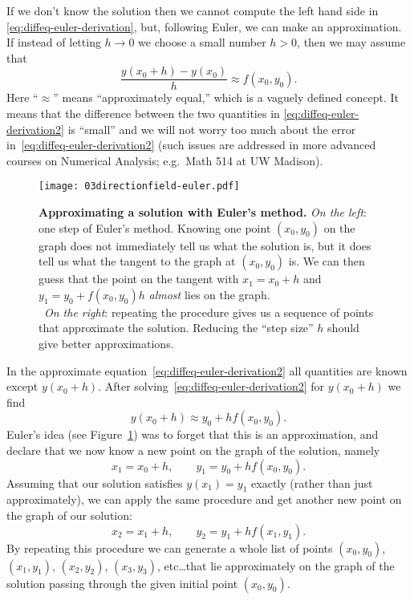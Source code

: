 If we don't know the solution then we cannot compute the left hand side in
\eqref{eq:diffeq-euler-derivation}, but, following Euler, we can make an
approximation.  If instead of letting $h\to0$ we choose a small number $h>0$, then we
may assume that
\begin{equation}
  \frac{y(x_0+h) - y(x_0)} {h}  \approx f(x_0, y_0).
  \label{eq:diffeq-euler-derivation2}
\end{equation}
Here ``$\approx$'' means ``approximately equal,'' which is a vaguely defined concept.
It means that the difference between the two quantities in
\eqref{eq:diffeq-euler-derivation2} is ``small'' and we will not worry too much about
the error in~\eqref{eq:diffeq-euler-derivation2} (such issues are addressed in more
advanced courses on Numerical Analysis; e.g.~Math 514 at UW Madison).
\begin{figure}
  \centering
  \problemfont%
  
  \noproblemfont
  \hfill
  \texttt{[image: 03directionfield-euler.pdf]}
  \caption{\textbf{Approximating a solution with Euler's method. } \textit{On the
      left}: one step of Euler's method.  Knowing one point $(x_0, y_0)$ on the graph
    does not immediately tell us what the solution is, but it does tell us what the
    tangent to the graph at $(x_0,y_0)$ is.  We can then guess that the point on the
    tangent with $x_1=x_0+h$ and $y_1=y_0+f(x_0, y_0)h$ \emph{almost} lies on the graph.\\
    ~\hspace{2em}\textit{On the right}: repeating the procedure gives us a sequence of points that
    approximate the solution.  Reducing the ``step size'' $h$ should give better
    approximations.}
  \label{fig:eulers-method}
\end{figure}
In the approximate equation~\eqref{eq:diffeq-euler-derivation2} all quantities are
known except $y(x_0+h)$.  After solving~\eqref{eq:diffeq-euler-derivation2} for
$y(x_0+h)$ we find
\begin{equation}
  y(x_0+h) \approx y_0 + h f(x_0, y_0).
  \label{eq:euler-one-step} 
\end{equation}
Euler's idea (see Figure~\ref{fig:eulers-method}) was to forget that this is an
approximation, and declare that we now know a new point on the graph of the solution,
namely
\begin{equation}
  x_1 = x_0+h, \qquad y_1 = y_0 + hf(x_0, y_0).
  \label{eq:euler-one-step}
\end{equation}
Assuming that our solution satisfies $y(x_1) = y_1$ exactly (rather than just
approximately), we can apply the same procedure and get another new point on
the graph of our solution:
\[
x_2 = x_1+h, \qquad y_2 = y_1+hf(x_1,y_1).
\]
By repeating this procedure we can generate a whole list of points $(x_0, y_0)$,
$(x_1,y_1)$, $(x_2, y_2)$, $(x_3, y_3)$, etc\dots that lie approximately on the graph
of the solution passing through the given initial point $(x_0,y_0)$.

